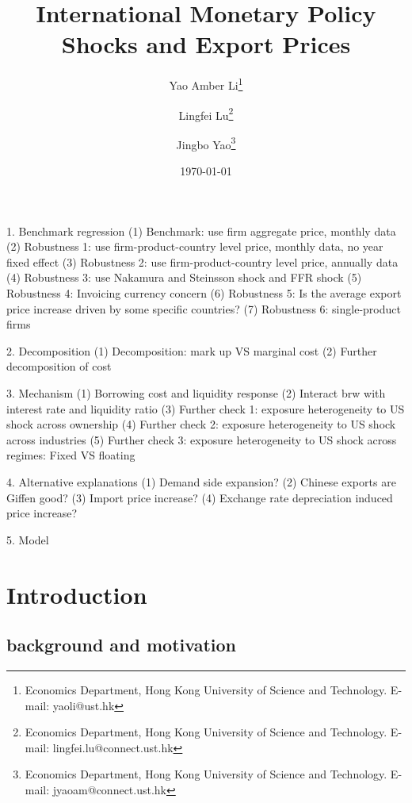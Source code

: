 \documentclass[12pt]{article}
\begin{document}
\title{\Large \textbf{International Monetary Policy Shocks and Export Prices}}


\author{Yao Amber Li\thanks{Economics Department, Hong Kong University of Science and Technology. E-mail: yaoli@ust.hk}
\medskip
\and Lingfei Lu\thanks{Economics Department, Hong Kong University of Science and Technology. E-mail: lingfei.lu@connect.ust.hk}
\medskip
\and Jingbo Yao\thanks{Economics Department, Hong Kong University of Science and Technology. E-mail: jyaoam@connect.ust.hk}
}


\date{\today}

\maketitle

\tableofcontents
\newpage





1. Benchmark regression
(1) Benchmark: use firm aggregate price, monthly data
(2) Robustness 1: use firm-product-country level price, monthly data, no year fixed effect
(3) Robustness 2: use firm-product-country level price, annually data
(4) Robustness 3: use Nakamura and Steinsson shock and FFR shock
(5) Robustness 4: Invoicing currency concern
(6) Robustness 5: Is the average export price increase driven by some specific countries?
(7) Robustness 6: single-product firms

2. Decomposition
(1) Decomposition: mark up VS marginal cost 
(2) Further decomposition of cost

3. Mechanism
(1) Borrowing cost and liquidity response
(2) Interact brw with interest rate and liquidity ratio
(3) Further check 1: exposure heterogeneity to US shock across ownership
(4) Further check 2: exposure heterogeneity to US shock across industries
(5) Further check 3: exposure heterogeneity to US shock across regimes: Fixed VS floating

4. Alternative explanations
(1) Demand side expansion?
(2) Chinese exports are Giffen good?
(3) Import price increase?
(4) Exchange rate depreciation induced price increase?

5. Model



\section{Introduction}

\subsection{background and motivation}
\end{document}
